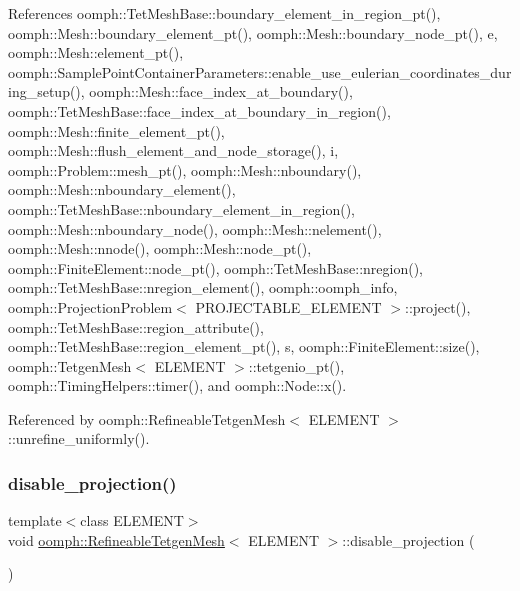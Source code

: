 References oomph\+::\+Tet\+Mesh\+Base\+::boundary\+\_\+element\+\_\+in\+\_\+region\+\_\+pt(), oomph\+::\+Mesh\+::boundary\+\_\+element\+\_\+pt(), oomph\+::\+Mesh\+::boundary\+\_\+node\+\_\+pt(), e, oomph\+::\+Mesh\+::element\+\_\+pt(), oomph\+::\+Sample\+Point\+Container\+Parameters\+::enable\+\_\+use\+\_\+eulerian\+\_\+coordinates\+\_\+during\+\_\+setup(), oomph\+::\+Mesh\+::face\+\_\+index\+\_\+at\+\_\+boundary(), oomph\+::\+Tet\+Mesh\+Base\+::face\+\_\+index\+\_\+at\+\_\+boundary\+\_\+in\+\_\+region(), oomph\+::\+Mesh\+::finite\+\_\+element\+\_\+pt(), oomph\+::\+Mesh\+::flush\+\_\+element\+\_\+and\+\_\+node\+\_\+storage(), i, oomph\+::\+Problem\+::mesh\+\_\+pt(), oomph\+::\+Mesh\+::nboundary(), oomph\+::\+Mesh\+::nboundary\+\_\+element(), oomph\+::\+Tet\+Mesh\+Base\+::nboundary\+\_\+element\+\_\+in\+\_\+region(), oomph\+::\+Mesh\+::nboundary\+\_\+node(), oomph\+::\+Mesh\+::nelement(), oomph\+::\+Mesh\+::nnode(), oomph\+::\+Mesh\+::node\+\_\+pt(), oomph\+::\+Finite\+Element\+::node\+\_\+pt(), oomph\+::\+Tet\+Mesh\+Base\+::nregion(), oomph\+::\+Tet\+Mesh\+Base\+::nregion\+\_\+element(), oomph\+::oomph\+\_\+info, oomph\+::\+Projection\+Problem$<$ P\+R\+O\+J\+E\+C\+T\+A\+B\+L\+E\+\_\+\+E\+L\+E\+M\+E\+N\+T $>$\+::project(), oomph\+::\+Tet\+Mesh\+Base\+::region\+\_\+attribute(), oomph\+::\+Tet\+Mesh\+Base\+::region\+\_\+element\+\_\+pt(), s, oomph\+::\+Finite\+Element\+::size(), oomph\+::\+Tetgen\+Mesh$<$ E\+L\+E\+M\+E\+N\+T $>$\+::tetgenio\+\_\+pt(), oomph\+::\+Timing\+Helpers\+::timer(), and oomph\+::\+Node\+::x().



Referenced by oomph\+::\+Refineable\+Tetgen\+Mesh$<$ E\+L\+E\+M\+E\+N\+T $>$\+::unrefine\+\_\+uniformly().

\mbox{\label{classoomph_1_1RefineableTetgenMesh_af5342732d4a4e715a443688a53801c00}} 
\subsubsection{\texorpdfstring{disable\+\_\+projection()}{disable\_projection()}}
{\footnotesize\ttfamily template$<$class E\+L\+E\+M\+E\+NT$>$ \\
void \hyperlink{classoomph_1_1RefineableTetgenMesh}{oomph\+::\+Refineable\+Tetgen\+Mesh}$<$ E\+L\+E\+M\+E\+NT $>$\+::disable\+\_\+projection (\begin{DoxyParamCaption}{ }\end{DoxyParamCaption})\hspace{0.3cm}{\ttfamily [inline]}}



